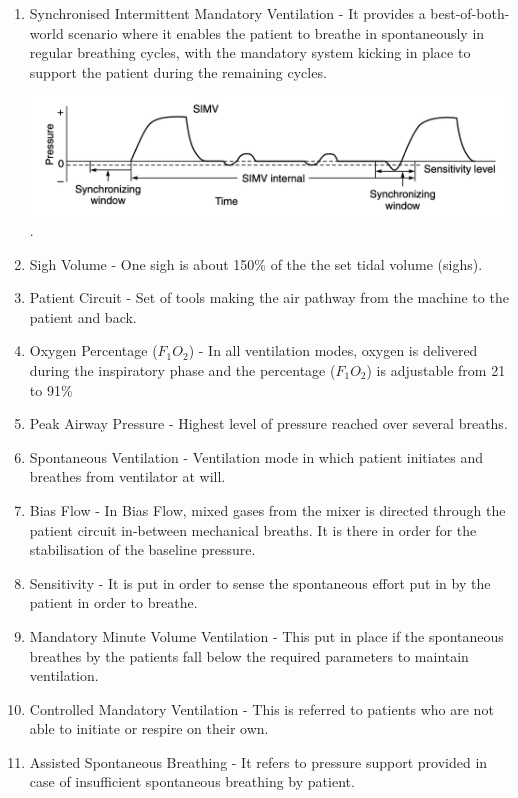 \documentclass{article}
\begin{document}
\begin{enumerate}
    \item Synchronised Intermittent Mandatory Ventilation - It provides a best-of-both-world scenario where it enables the patient to breathe in spontaneously in regular breathing cycles, with the mandatory system kicking in place to support the patient during the remaining cycles. \\ 
    \begin{center}
        \includegraphics[scale=0.5]{Screenshot 2023-04-29 at 4.31.20 PM.png}.
    \end{center}
    \item Sigh Volume - One sigh is about 150\% of the the set tidal volume (sighs).
    \item Patient Circuit - Set of tools making the air pathway from the machine to the patient and back.
    \item Oxygen Percentage ($F_1O_2$) - In all ventilation modes, oxygen is delivered during the inspiratory phase and the percentage ($F_1O_2$) is adjustable from 21 to 91\%
    \item Peak Airway Pressure - Highest level of pressure reached over several breaths.
    \item Spontaneous Ventilation - Ventilation mode in which patient initiates and breathes from ventilator at will.
    \item Bias Flow - In Bias Flow, mixed gases from the mixer is directed through the patient circuit in-between mechanical breaths. It is there in order for the stabilisation of the baseline pressure.
    \item Sensitivity - It is put in order to sense the spontaneous effort put in by the patient in order to breathe.
    \item Mandatory Minute Volume Ventilation - This put in place if the spontaneous breathes by the patients fall below the required parameters to maintain ventilation.
    \item Controlled Mandatory Ventilation - This is referred to patients who are not able to initiate or respire on their own.
    \item Assisted Spontaneous Breathing - It refers to pressure support provided in case of insufficient spontaneous breathing by patient.

\end{enumerate}
\end{document}
